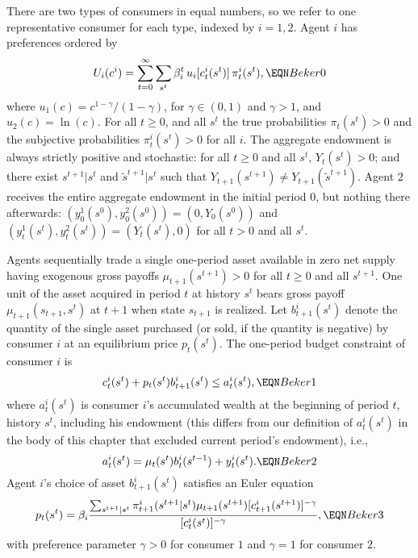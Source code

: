 There are two types of consumers in equal numbers, so we refer to
one representative consumer for each type, indexed by $i=1,2$.
Agent $i$ has preferences ordered by
$$ U_i(c^i) =
   \sum_{t=0}^\infty \sum_{s^t} \beta_i^t \,u_i[c_t^i(s^t)]\,
   \pi_t^i(s^t),  \EQN Beker0 $$
where  $u_1(c)=c^{1-\gamma}/(1-\gamma)$,
for $\gamma\in(0,1)$ and $\gamma> 1$, and  $u_2(c) = \ln (c)$.
For all $t\geq0$, and all $s^t$ the true
probabilities $\pi_t(s^t)>0$ and the subjective probabilities
$\pi_t^i(s^t)>0$ for all $i$.
The aggregate endowment is always strictly positive and stochastic:
for all $t\geq 0$ and all $s^t$, $Y_t(s^t)>0$; and there exist
$s^{t+1}|s^t$ and $\tilde s^{t+1}|s^t$ such that
$Y_{t+1}(s^{t+1}) \neq Y_{t+1}(\tilde s^{t+1})$.
Agent $2$ receives the entire aggregate
endowment  in the initial period $0$,
but nothing there afterwards: $(y_0^1(s^0), y_0^2(s^0)) = (0, Y_0(s^0))$ and
$(y_t^1(s^t), y_t^2(s^t)) = (Y_t(s^t), 0)$ for all $t> 0$
and all $s^t$.



Agents sequentially trade  a single one-period asset
available in zero net supply having exogenous gross
payoffs $\mu_{t+1}(s^{t+1})>0$ for all $t\ge0$ and all $s^{t+1}$.
One unit of the asset acquired in period $t$ at history $s^t$ bears
 gross payoff $\mu_{t+1}(s_{t+1}, s^t)$ at $t+1$  when
state $s_{t+1}$ is realized. Let $b^i_{t+1}(s^t)$ denote the quantity of
the single asset purchased (or sold, if the quantity is negative)
by consumer $i$ at an equilibrium price $p_t(s^t)$.
The one-period budget constraint of consumer $i$ is
$$ c^i_t(s^t) + p_t(s^t) b^i_{t+1}(s^t) \leq a^i_t(s^t),  \EQN Beker1
$$
where $a^i_t(s^t)$ is consumer $i$'s accumulated wealth at the beginning
of period $t$, history $s^t$, including his endowment (this differs from our definition of $a^i_t(s^t)$
in the body of this chapter
that excluded current period's endowment), i.e.,
$$ a^i_t(s^t) = \mu_t(s^t) b^i_t(s^{t-1}) + y^i_t(s^t).  \EQN Beker2
$$
Agent $i$'s choice of asset $b^i_{t+1}(s^t)$ satisfies an Euler equation
$$
p_t(s^t) = \beta_i {\sum_{s^{t+1} | s^t} \pi^i_{t+1}(s^{t+1}| s^t)
\mu_{t+1}(s^{t+1}) [c^i_{t+1}(s^{t+1})]^{-\gamma} \over
[c^i_t(s^t)]^{-\gamma} },                                 \EQN Beker3
$$
with preference parameter $\gamma>0$ for consumer $1$ and $\gamma=1$ for
consumer $2$.

